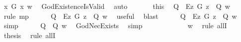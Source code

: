 \begin{isabellebody}
\ {\isachardoublequoteopen}{\isasymexists}x{\isachardot}\ G\ x\ w{\isachardoublequoteclose}\ \isamarkupfalse%
\ GodExistenceIsValid\ \isamarkupfalse%
\ auto\isanewline
\ \ \ \ \isamarkupfalse%
\ {}\ this\ \isamarkupfalse%
\ {\isachardoublequoteopen}{\isacharparenleft}Q\ \isactrlbold {\isasymrightarrow}\ \isactrlbold {\isasymbox}{\isacharparenleft}\isactrlbold {\isasymforall}\isactrlsup Ez{\isachardot}\ G\ z\ \isactrlbold {\isasymrightarrow}\ Q{\isacharparenright}{\isacharparenright}\ w{\isachardoublequoteclose}\ \isamarkupfalse%
\ {\isacharparenleft}rule\ mp{\isacharparenright}\isanewline
\ \ \ \ \isamarkupfalse%
\ {\isachardoublequoteopen}{\isacharparenleft}Q\ \isactrlbold {\isasymrightarrow}\ \isactrlbold {\isasymbox}{\isacharparenleft}{\isacharparenleft}\isactrlbold {\isasymexists}\isactrlsup Ez{\isachardot}\ G\ z{\isacharparenright}\ \isactrlbold {\isasymrightarrow}\ Q{\isacharparenright}{\isacharparenright}\ w{\isachardoublequoteclose}\ \isamarkupfalse%
\ useful\ \isamarkupfalse%
\ blast\isanewline
\ \ \ \ \isamarkupfalse%
\ {\isachardoublequoteopen}{\isacharparenleft}Q\ \isactrlbold {\isasymrightarrow}\ {\isacharparenleft}\isactrlbold {\isasymbox}{\isacharparenleft}\isactrlbold {\isasymexists}\isactrlsup Ez{\isachardot}\ G\ z{\isacharparenright}\ \isactrlbold {\isasymrightarrow}\ \isactrlbold {\isasymbox}Q{\isacharparenright}{\isacharparenright}\ w{\isachardoublequoteclose}\ \isamarkupfalse%
\ simp\isanewline
\ \ \ \ \isamarkupfalse%
\ {\isachardoublequoteopen}{\isacharparenleft}Q\ \isactrlbold {\isasymrightarrow}\ \isactrlbold {\isasymbox}Q{\isacharparenright}\ w{\isachardoublequoteclose}\ \isamarkupfalse%
\ GodNecExists\ \isamarkupfalse%
\ simp\isanewline
\ \ \ \isacommand{{\isacharbraceright}}\isamarkupfalse%
\isanewline
\ \ \isamarkupfalse%
\ {\isachardoublequoteopen}{\isacharparenleft}\isactrlbold {\isasymforall}{\isasymPhi}{\isachardot}\ {\isasymPhi}\ \isactrlbold {\isasymrightarrow}\ \isactrlbold {\isasymbox}\ {\isasymPhi}{\isacharparenright}\ w{\isachardoublequoteclose}\ \isamarkupfalse%
\ {\isacharparenleft}rule\ allI{\isacharparenright}\isanewline
\ \ \isacommand{{\isacharbraceright}}\isamarkupfalse%
\isanewline
\ \ \isamarkupfalse%
\ {\isacharquery}thesis\ \isamarkupfalse%
\ {\isacharparenleft}rule\ allI{\isacharparenright}\isanewline
{}\isamarkupfalse%
%
\endisatagproof
{\isafoldproof}%
%
\isadelimproof
%
\endisadelimproof
%
\begin{isamarkuptext}%
\pagebreak%
\end{isamarkuptext}\isamarkuptrue%
%
\isadelimtheory
%
\endisadelimtheory
%
\isatagtheory
%
\endisatagtheory
{\isafoldtheory}%
%
\isadelimtheory
%
\endisadelimtheory
%
\end{isabellebody}%

